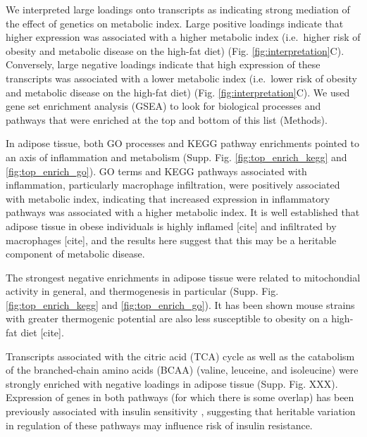\documentclass[
]{article}
\begin{document}
We interpreted large loadings onto transcripts as indicating strong
mediation of the effect of genetics on metabolic index. Large positive
loadings indicate that higher expression was associated with a higher
metabolic index (i.e.~higher risk of obesity and metabolic disease on
the high-fat diet) (Fig. \ref{fig:interpretation}C). Conversely, large
negative loadings indicate that high expression of these transcripts was
associated with a lower metabolic index (i.e.~lower risk of obesity and
metabolic disease on the high-fat diet) (Fig.
\ref{fig:interpretation}C). We used gene set enrichment analysis (GSEA)
\cite{fgsea, 
pmid16199517} to look for biological processes and pathways that were
enriched at the top and bottom of this list (Methods).

In adipose tissue, both GO processes and KEGG pathway enrichments
pointed to an axis of inflammation and metabolism (Supp. Fig.
\ref{fig:top_enrich_kegg} and \ref{fig:top_enrich_go}). GO terms and
KEGG pathways associated with inflammation, particularly macrophage
infiltration, were positively associated with metabolic index,
indicating that increased expression in inflammatory pathways was
associated with a higher metabolic index. It is well established that
adipose tissue in obese individuals is highly inflamed {[}cite{]} and
infiltrated by macrophages {[}cite{]}, and the results here suggest that
this may be a heritable component of metabolic disease.

The strongest negative enrichments in adipose tissue were related to
mitochondial activity in general, and thermogenesis in particular (Supp.
Fig. \ref{fig:top_enrich_kegg} and \ref{fig:top_enrich_go}). It has been
shown mouse strains with greater thermogenic potential are also less
susceptible to obesity on a high-fat diet {[}cite{]}.

Transcripts associated with the citric acid (TCA) cycle as well as the
catabolism of the branched-chain amino acids (BCAA) (valine, leuceine,
and isoleucine) were strongly enriched with negative loadings in adipose
tissue (Supp. Fig. XXX). Expression of genes in both pathways (for which
there is some overlap) has been previously associated with insulin
sensitivity \cite{pmid29567659, 
pmid22560213, pmid19841271}, suggesting that heritable variation in
regulation of these pathways may influence risk of insulin resistance.
\end{document}
